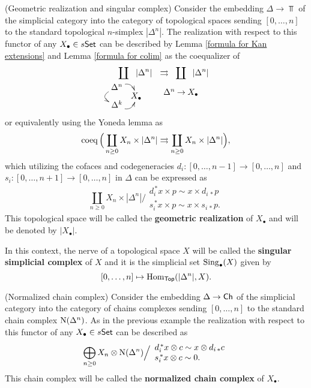 \documentclass[thesis.tex]{subfiles}
\begin{document}
\begin{example}(Geometric realization and singular complex) \label{geometric realization}
Consider the embedding $\Delta\to\Top$ of the simplicial category into the category of topological spaces sending $[0,\dotsc,n]$ to the standard topological $n$-simplex $|\Delta^n|$. The realization with respect to this functor of any $X_\bullet\in s\mathsf{Set}$ can be described by Lemma \ref{formula for Kan extensions} and Lemma \ref{formula for colim} as the coequalizer of
$$\coprod_{\ \ \xymatrix@C=.3pc @R=-.3pc{\Delta^n\ar@/^.8pc/[rd]\ar@/_1.2pc/[dd]& \\ & X_\bullet\\ \Delta^k\ar@/_.8pc/[ru]&}}\hspace*{-.41cm}|\Delta^n| \ \ \rightrightarrows\hspace*{-.41cm}\coprod_{\xymatrix@C=-.3pc@R=.1pc{& \\ \Delta^n&\to&X_\bullet}}\hspace*{-.41cm}|\Delta^n|$$or equivalently using the Yoneda lemma as
$$\operatorname{coeq}\Big(\coprod_{n\geq0}X_n\times|\Delta^n|\rightrightarrows\coprod_{n\geq0}X_n\times|\Delta^n|\Big),$$
which utilizing the cofaces and codegeneracies $d_i:[0,\dotsc,n-1]\to[0,\dotsc,n]$ and $s_i:[0,\dotsc,n+1]\to[0,\dotsc,n]$ in $\Delta$ can be expressed as
$$\coprod_{n\geq0}X_n\times|\Delta^n|\Big/\begin{array}{c} d_i^{\,*}x\times p\sim x\times d_{i\,*}p\\ s_i^{\,*}x\times p\sim x\times s_{i\,*}p.\end{array}$$
This topological space will be called the \textbf{geometric realization} of $X_\bullet$ and will be denoted by $|X_\bullet|$.\par
In this context, the nerve of a topological space $X$ will be called the \textbf{singular simplicial complex} of $X$ and it is the simplicial set $\operatorname{Sing}_\bullet(X)$ given by $$[0,\dotsc,n]\mapsto\mathrm{Hom}_{\mathsf{Top}}(|\Delta^n|,X).$$
\end{example}

\begin{example}(Normalized chain complex) \label{normalized chain complex}
Consider the embedding $\Delta\to\mathsf{Ch}$ of the simplicial category into the category of chains complexes sending $[0,\dotsc,n]$ to the standard chain complex $\operatorname{N}(\Delta^n)$. As in the previous example the realization with respect to this functor of any $X_\bullet\in s\mathsf{Set}$ can be described as
$$\bigoplus_{n\geq0}X_n\otimes\operatorname{N}(\Delta^n)\Big/\begin{array}{l} d_i^{\,*}x\otimes c\sim x\otimes d_{i\,*}c\\ s_i^{\,*}x\otimes c\sim 0.\end{array}$$
This chain complex will be called the \textbf{normalized chain complex} of $X_\bullet$.
\end{example}
\end{document}
